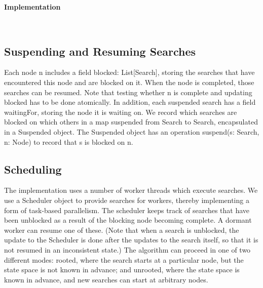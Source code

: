 \documentclass{article}
\begin{document}
\begin{large}\textbf{Implementation}\end{large}\\
\subsection{Suspending and Resuming Searches}{Each node n includes a field blocked: List[Search], storing the searches that have encountered this node and are blocked on it. When the node is completed, those searches can be resumed. Note that testing whether n is complete and updating blocked has to be done atomically. In addition, each suspended search has a field waitingFor, storing the node it is waiting on. We record which searches are blocked on which others in a map suspended from Search to Search, encapsulated in a Suspended object. The Suspended object has an operation suspend(s: Search, n: Node) to record that s is blocked on n.}

\subsection{Scheduling}{The implementation uses a number of worker threads which execute searches. We use a Scheduler object to provide searches for workers, thereby implementing a form of task-based parallelism. The scheduler keeps track of searches that have been unblocked as a result of the blocking node becoming complete. A dormant worker can resume one of these. (Note that when a search is unblocked, the update to the Scheduler is done after the updates to the search itself, so that it is not resumed in an inconsistent state.) The algorithm can proceed in one of two different modes: rooted, where the search starts at a particular node, but the state space is not known in advance; and unrooted, where the state space is known in advance, and new searches can start at arbitrary nodes.}\cite{ref4}



\end{document}
